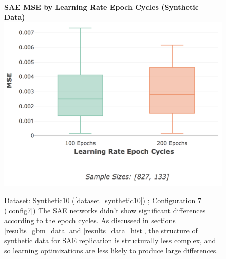\documentclass[a4paper,11pt,oneside]{article}
\theoremstyle{plain}
\theoremstyle{definition}
\begin{document}
\begin{figure}[H]
	\centering 
	\textbf{SAE MSE by Learning Rate Epoch Cycles (Synthetic Data)}
	\includegraphics[scale=0.3]{images/results/network/lr/synth_mse_lr_epochs.png} 
	\caption[SAE MSE by Learning Rate Epoch Cycles (Synthetic Data)]{Dataset: Synthetic10 (\ref{dataset_synthetic10}) ; Configuration 7 (\ref{config7})
		\newline The SAE networks didn't show significant differences according to the epoch cycles. As discussed in sections \ref{results_gbm_data} and \ref{results_data_hist}, the structure of synthetic data for SAE replication is structurally less complex, and so learning optimizations are less likely to produce large differences.}
	\label{figure-synth_mse_lr_epochs}
\end{figure}
\end{document}
